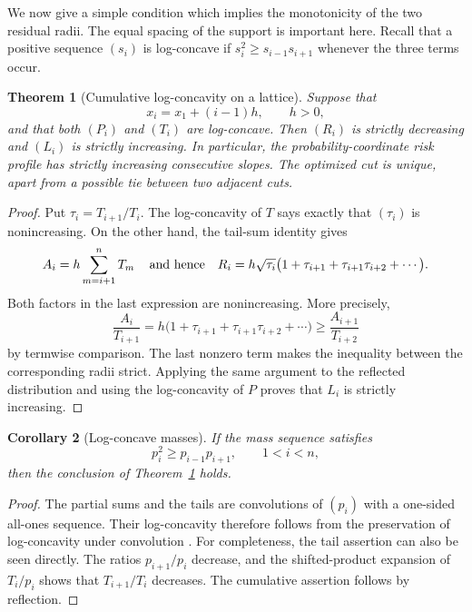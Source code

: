 \documentclass[a4paper]{amsart}
\numberwithin{equation}{section}
\newtheorem{theorem}{Theorem}[section]
\newtheorem{corollary}[theorem]{Corollary}
\theoremstyle{remark}
\newcommand{\1}{\mathbf 1}
\begin{document}
We now give a simple condition which implies the monotonicity of the two
residual radii.  The equal spacing of the support is important here.  Recall
that a positive sequence
$(s_i)$ is log-concave if $s_i^2\geq s_{i-1}s_{i+1}$ whenever the three terms
occur.

\begin{theorem}[Cumulative log-concavity on a lattice]
\label{thm:cumulative-lc}
Suppose that
\[
  x_i=x_1+(i-1)h,\qquad h>0,
\]
and that both $(P_i)$ and $(T_i)$ are log-concave.  Then $(R_i)$ is strictly
decreasing and $(L_i)$ is strictly increasing.  In particular, the
probability-coordinate risk profile has strictly increasing consecutive
slopes.  The optimized cut is
unique, apart from a possible tie between two adjacent cuts.
\end{theorem}

\begin{proof}
Put $\tau_i=T_{i+1}/T_i$.  The log-concavity of $T$ says exactly that
$(\tau_i)$ is nonincreasing.  On the other hand, the tail-sum identity gives
\[
 A_i=h\sum_{m=i+1}^nT_m
 \,\quad\hbox{and hence}\quad
 R_i=h\sqrt{\tau_i}
 \bigl(1+\tau_{i+1}+\tau_{i+1}\tau_{i+2}+\cdots\bigr).
\]
Both factors in the last expression are nonincreasing.  More precisely,
\[
 \frac{A_i}{T_{i+1}}
 =h\bigl(1+\tau_{i+1}+\tau_{i+1}\tau_{i+2}+\cdots\bigr)
 \geq \frac{A_{i+1}}{T_{i+2}}
\]
by termwise comparison.  The last nonzero term makes the inequality between
the corresponding radii strict.  Applying the same argument to the reflected
distribution and using the log-concavity of $P$ proves that $L_i$ is strictly
increasing.
\end{proof}

\begin{corollary}[Log-concave masses]\label{cor:pmf-lc}
If the mass sequence satisfies
\begin{equation}\label{eq:pmf-lc}
  p_i^2\geq p_{i-1}p_{i+1},\qquad 1<i<n,
\end{equation}
then the conclusion of Theorem~\ref{thm:cumulative-lc} holds.
\end{corollary}

\begin{proof}
The partial sums and the tails are convolutions of $(p_i)$ with a one-sided
all-ones sequence.  Their log-concavity therefore follows from the
preservation of log-concavity under convolution
\cite{johnson-goldschmidt}.  For completeness, the tail assertion can also be
seen directly.  The ratios $p_{i+1}/p_i$ decrease, and the shifted-product
expansion of $T_i/p_i$ shows that $T_{i+1}/T_i$ decreases.  The cumulative
assertion follows by reflection.
\end{proof}
\end{document}
